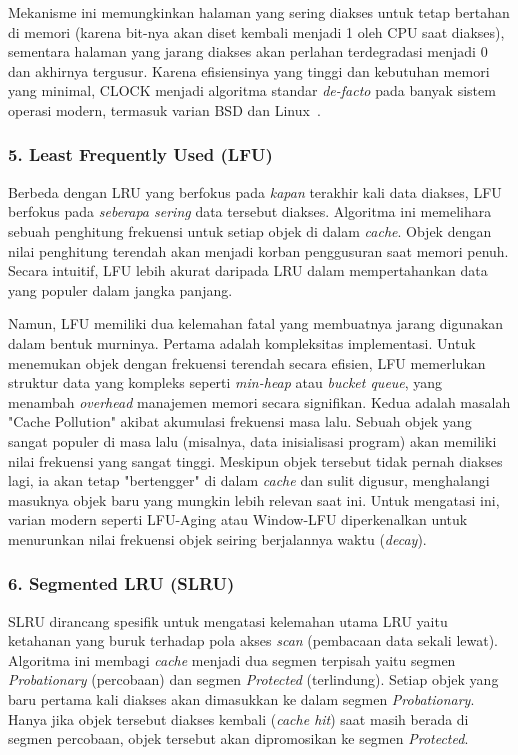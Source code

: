 Mekanisme ini memungkinkan halaman yang sering diakses untuk tetap
bertahan di memori
(karena bit-nya akan diset kembali menjadi 1 oleh CPU saat diakses),
sementara halaman
yang jarang diakses akan perlahan terdegradasi menjadi 0 dan akhirnya tergusur.
Karena efisiensinya yang tinggi dan kebutuhan memori yang minimal, CLOCK menjadi
algoritma standar \textit{de-facto} pada banyak sistem operasi
modern, termasuk varian BSD dan Linux~\cite{Love2010Linux}.

\subsubsection{5. Least Frequently Used (LFU)}
Berbeda dengan LRU yang berfokus pada \textit{kapan} terakhir kali data diakses,
LFU berfokus pada \textit{seberapa sering} data tersebut diakses.
Algoritma ini memelihara sebuah penghitung frekuensi untuk setiap
objek di dalam \textit{cache}.
Objek dengan nilai penghitung terendah akan menjadi korban
penggusuran saat memori penuh.
Secara intuitif, LFU lebih akurat daripada LRU dalam mempertahankan
data yang populer dalam jangka panjang.

Namun, LFU memiliki dua kelemahan fatal yang membuatnya jarang
digunakan dalam bentuk murninya.
Pertama adalah kompleksitas implementasi.
Untuk menemukan objek dengan frekuensi terendah secara efisien, LFU
memerlukan struktur data yang kompleks seperti \textit{min-heap} atau
\textit{bucket queue}, yang menambah \textit{overhead} manajemen
memori secara signifikan.
Kedua adalah masalah "Cache Pollution" akibat akumulasi frekuensi masa lalu.
Sebuah objek yang sangat populer di masa lalu (misalnya, data
inisialisasi program) akan memiliki nilai frekuensi yang sangat tinggi.
Meskipun objek tersebut tidak pernah diakses lagi, ia akan tetap
"bertengger" di dalam \textit{cache} dan sulit digusur, menghalangi
masuknya objek baru yang mungkin lebih relevan saat ini.
Untuk mengatasi ini, varian modern seperti LFU-Aging atau Window-LFU
diperkenalkan untuk menurunkan nilai frekuensi objek seiring
berjalannya waktu (\textit{decay}).

\subsubsection{6. Segmented LRU (SLRU)}
SLRU dirancang spesifik untuk mengatasi kelemahan utama LRU yaitu
ketahanan yang buruk terhadap pola akses \textit{scan} (pembacaan
data sekali lewat).
Algoritma ini membagi \textit{cache} menjadi dua segmen terpisah
yaitu segmen \textit{Probationary} (percobaan) dan segmen
\textit{Protected} (terlindung).
Setiap objek yang baru pertama kali diakses akan dimasukkan ke dalam
segmen \textit{Probationary}.
Hanya jika objek tersebut diakses kembali (\textit{cache hit}) saat
masih berada di segmen percobaan, objek tersebut akan dipromosikan ke
segmen \textit{Protected}.

